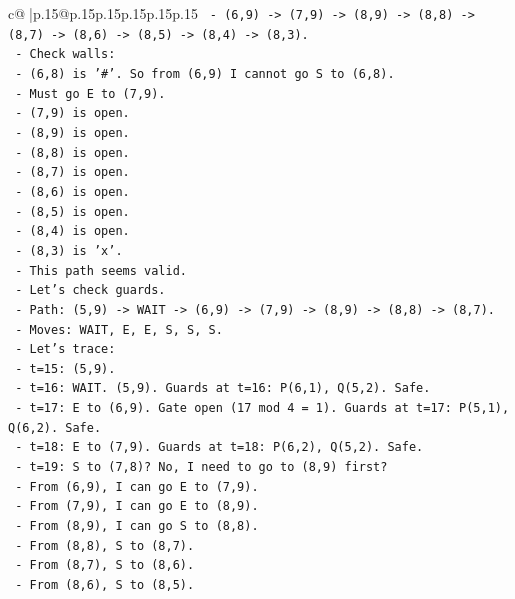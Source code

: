 \documentclass{article}
\begin{document}
{\begin{supertabular}{c@{$\;$}|p{.15\linewidth}@{}p{.15\linewidth}p{.15\linewidth}p{.15\linewidth}p{.15\linewidth}p{.15\linewidth}}
{{{\texttt{     {-} (6,9) {-}> (7,9) {-}> (8,9) {-}> (8,8) {-}> (8,7) {-}> (8,6) {-}> (8,5) {-}> (8,4) {-}> (8,3).} \\
\texttt{     {-} Check walls:} \\
\texttt{       {-} (6,8) is '\#'. So from (6,9) I cannot go S to (6,8).} \\
\texttt{       {-} Must go E to (7,9).} \\
\texttt{       {-} (7,9) is open.} \\
\texttt{       {-} (8,9) is open.} \\
\texttt{       {-} (8,8) is open.} \\
\texttt{       {-} (8,7) is open.} \\
\texttt{       {-} (8,6) is open.} \\
\texttt{       {-} (8,5) is open.} \\
\texttt{       {-} (8,4) is open.} \\
\texttt{       {-} (8,3) is 'x'.} \\
\texttt{     {-} This path seems valid.} \\
\texttt{     {-} Let's check guards.} \\
\texttt{     {-} Path: (5,9) {-}> WAIT {-}> (6,9) {-}> (7,9) {-}> (8,9) {-}> (8,8) {-}> (8,7).} \\
\texttt{     {-} Moves: WAIT, E, E, S, S, S.} \\
\texttt{     {-} Let's trace:} \\
\texttt{       {-} t=15: (5,9).} \\
\texttt{       {-} t=16: WAIT. (5,9). Guards at t=16: P(6,1), Q(5,2). Safe.} \\
\texttt{       {-} t=17: E to (6,9). Gate open (17 mod 4 = 1). Guards at t=17: P(5,1), Q(6,2). Safe.} \\
\texttt{       {-} t=18: E to (7,9). Guards at t=18: P(6,2), Q(5,2). Safe.} \\
\texttt{       {-} t=19: S to (7,8)? No, I need to go to (8,9) first?} \\
\texttt{         {-} From (6,9), I can go E to (7,9).} \\
\texttt{         {-} From (7,9), I can go E to (8,9).} \\
\texttt{         {-} From (8,9), I can go S to (8,8).} \\
\texttt{         {-} From (8,8), S to (8,7).} \\
\texttt{         {-} From (8,7), S to (8,6).} \\
\texttt{         {-} From (8,6), S to (8,5).} \\
}}}
\end{supertabular}}
\end{document}
